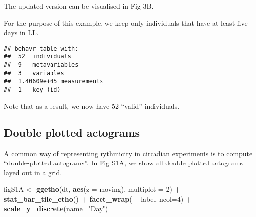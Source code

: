 \documentclass[]{article}
\newenvironment{Shaded}{\begin{snugshade}}{\end{snugshade}}
\newcommand{\DataTypeTok}[1]{\textcolor[rgb]{0.13,0.29,0.53}{#1}}
\newcommand{\DecValTok}[1]{\textcolor[rgb]{0.00,0.00,0.81}{#1}}
\newcommand{\KeywordTok}[1]{\textcolor[rgb]{0.13,0.29,0.53}{\textbf{#1}}}
\newcommand{\NormalTok}[1]{#1}
\newcommand{\OperatorTok}[1]{\textcolor[rgb]{0.81,0.36,0.00}{\textbf{#1}}}
\newcommand{\StringTok}[1]{\textcolor[rgb]{0.31,0.60,0.02}{#1}}
\begin{document}
The updated version can be visualised in Fig 3B.

For the purpose of this example, we keep only individuals that have at
least five days in LL.

\begin{Shaded}
\end{Shaded}

\begin{verbatim}
## behavr table with:
##  52  individuals
##  9   metavariables
##  3   variables
##  1.40609e+05 measurements
##  1   key (id)
\end{verbatim}

Note that as a result, we now have 52 ``valid'' individuals.

\hypertarget{double-plotted-actograms}{%
\subsection{Double plotted actograms}\label{double-plotted-actograms}}

A common way of representing rythmicity in circadian experiments is to
compute ``double-plotted actograms''. In Fig S1A, we show all double
plotted actograms layed out in a grid.

\begin{Shaded}
\begin{Highlighting}[]
\NormalTok{figS1A <-}\StringTok{ }\KeywordTok{ggetho}\NormalTok{(dt, }\KeywordTok{aes}\NormalTok{(}\DataTypeTok{z =}\NormalTok{ moving), }\DataTypeTok{multiplot =} \DecValTok{2}\NormalTok{) }\OperatorTok{+}
\StringTok{            }\KeywordTok{stat_bar_tile_etho}\NormalTok{() }\OperatorTok{+}\StringTok{ }
\StringTok{            }\KeywordTok{facet_wrap}\NormalTok{( }\OperatorTok{~}\StringTok{ }\NormalTok{label, }\DataTypeTok{ncol=}\DecValTok{4}\NormalTok{) }\OperatorTok{+}
\StringTok{            }\KeywordTok{scale_y_discrete}\NormalTok{(}\DataTypeTok{name=}\StringTok{"Day"}\NormalTok{)}
\end{Highlighting}
\end{Shaded}
\end{document}
